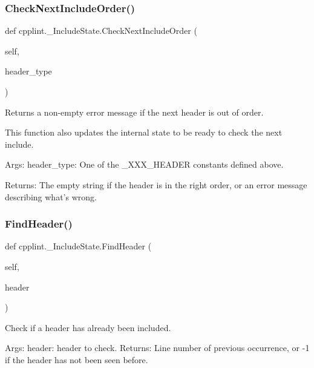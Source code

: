 \subsubsection{\texorpdfstring{Check\+Next\+Include\+Order()}{CheckNextIncludeOrder()}}
{\footnotesize\ttfamily def cpplint.\+\_\+\+Include\+State.\+Check\+Next\+Include\+Order (\begin{DoxyParamCaption}\item[{}]{self,  }\item[{}]{header\+\_\+type }\end{DoxyParamCaption})}

\begin{DoxyVerb}Returns a non-empty error message if the next header is out of order.

This function also updates the internal state to be ready to check
the next include.

Args:
  header_type: One of the _XXX_HEADER constants defined above.

Returns:
  The empty string if the header is in the right order, or an
  error message describing what's wrong.\end{DoxyVerb}
 \mbox{\label{classcpplint_1_1__IncludeState_a9bddbf581fc7a4c3c0258eaa42b94c3a}} 
\subsubsection{\texorpdfstring{Find\+Header()}{FindHeader()}}
{\footnotesize\ttfamily def cpplint.\+\_\+\+Include\+State.\+Find\+Header (\begin{DoxyParamCaption}\item[{}]{self,  }\item[{}]{header }\end{DoxyParamCaption})}

\begin{DoxyVerb}Check if a header has already been included.

Args:
  header: header to check.
Returns:
  Line number of previous occurrence, or -1 if the header has not
  been seen before.
\end{DoxyVerb}
 \mbox{\label{classcpplint_1_1__IncludeState_abfda27324121ab0bf9d29866d975274b}} 
